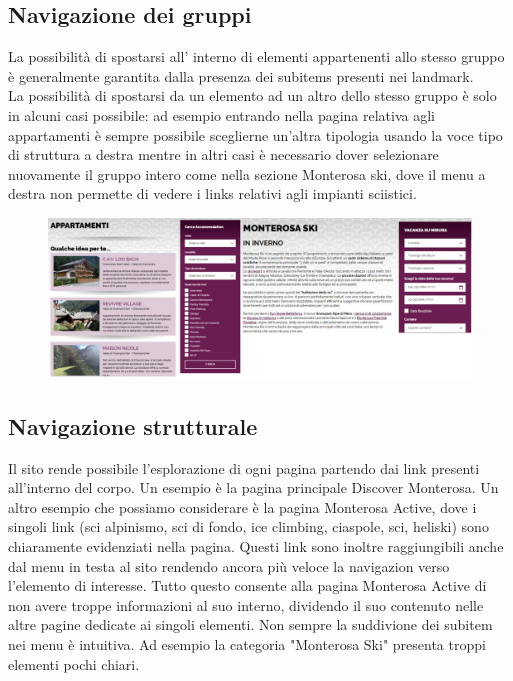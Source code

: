         \subsection{Navigazione dei gruppi}
        La possibilità di spostarsi all’ interno di elementi appartenenti allo
        stesso gruppo è generalmente garantita dalla presenza dei subitems
        presenti nei landmark. \\
        La possibilità di spostarsi da un elemento ad un altro dello stesso
        gruppo è solo in alcuni casi possibile: ad esempio entrando nella pagina
        relativa agli appartamenti è sempre possibile sceglierne un'altra
        tipologia usando la voce tipo di struttura a destra mentre in altri casi
        è necessario dover selezionare nuovamente il gruppo intero come nella sezione
        Monterosa ski, dove il menu a destra non permette di vedere i links relativi 
        agli impianti sciistici.
        \begin{figure}[H]
            \centering
            \includegraphics[scale=0.6]{resources/images/groupNavigationFinals.jpg}
        \end{figure}

        \subsection{Navigazione strutturale}
        Il sito rende possibile l'esplorazione di ogni pagina partendo dai link
        presenti all’interno del corpo. Un esempio è  la pagina principale
        Discover Monterosa. Un altro esempio che possiamo considerare è la
        pagina Monterosa Active, dove i singoli link  (sci alpinismo, sci di
        fondo, ice climbing, ciaspole, sci, heliski) sono chiaramente
        evidenziati nella pagina. Questi link sono inoltre raggiungibili anche
        dal menu in testa al sito rendendo ancora più veloce la navigazion verso
        l’elemento di interesse. Tutto questo consente alla pagina Monterosa
        Active di non avere troppe informazioni al suo interno, dividendo il suo
        contenuto nelle altre pagine dedicate ai singoli elementi. Non sempre la
        suddivione dei subitem nei menu è intuitiva. Ad esempio la categoria
        "Monterosa Ski" presenta troppi elementi pochi chiari.

